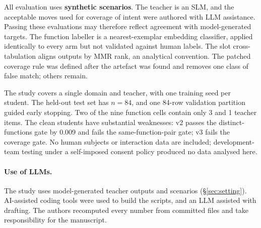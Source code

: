 All evaluation uses \textbf{synthetic scenarios}. The teacher is an SLM,
and the acceptable moves used for coverage of intent were authored with
LLM assistance. Passing these evaluations may therefore reflect agreement
with model-generated targets. The function labeller is a nearest-exemplar
embedding classifier, applied identically to every arm but not validated
against human labels. The slot cross-tabulation aligns outputs by MMR
rank, an analytical convention. The patched coverage rule was defined
after the artefact was found and removes one class of false match; others
remain.

The study covers a single domain and teacher, with one training seed per
student. The held-out test set has $n=84$, and one 84-row validation
partition guided early stopping. Two of the nine function cells contain
only 3 and 1 teacher items. The clean students have substantial weaknesses:
v2 passes the distinct-functions gate by 0.009 and fails the
same-function-pair gate; v3 fails the coverage gate. No human subjects or
interaction data are included; development-team testing under a
self-imposed consent policy produced no data analysed here.

\paragraph{Use of LLMs.}
The study uses model-generated teacher outputs and scenarios
(\S\ref{sec:setting}). AI-assisted coding tools were used to build the
scripts, and an LLM assisted with drafting. The authors recomputed every
number from committed files and take responsibility for the manuscript.

